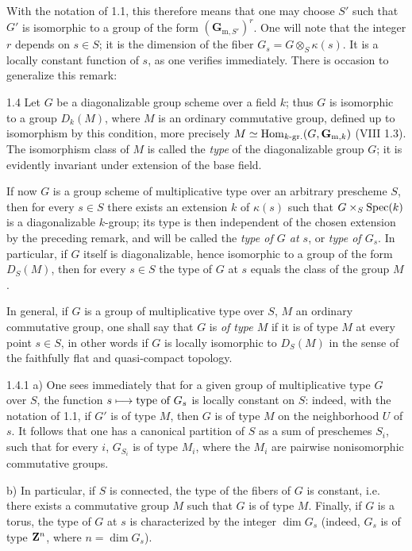With the notation of 1.1, this therefore means that one may choose $S'$ such that $G'$ is isomorphic to a group of the form $(\mathbf{G}_{\mathrm{m},S'})^r$. One will note that the integer $r$ depends on $s\in S$; it is the dimension of the fiber $G_s=G\otimes_S\kappa(s)$. It is a locally constant function of $s$, as one verifies immediately. There is occasion to generalize this remark:
\begin{definition}{1.4}\label{IX.1.4}
Let $G$ be a diagonalizable group scheme over a field $k$; thus $G$ is isomorphic to a group $D_k(M)$, where $M$ is an ordinary commutative group, defined up to isomorphism by this condition, more precisely $M\simeq\operatorname{Hom}_{k\text{-}\mathrm{gr.}}(G,\mathbf{G}_{\mathrm{m},k})$ (VIII 1.3). The isomorphism class of $M$ is called the \emph{type} of the diagonalizable group $G$; it is evidently invariant under extension of the base field.

If now $G$ is a group scheme of multiplicative type over an arbitrary prescheme $S$, then for every $s\in S$ there exists an extension $k$ of $\kappa(s)$ such that $G\times_S\operatorname{Spec}(k)$ is a diagonalizable $k$-group; its type is then independent of the chosen extension by the preceding remark, and will be called the \emph{type of $G$ at $s$}, or \emph{type of $G_s$}. In particular, if $G$ itself is diagonalizable, hence isomorphic to a group of the form $D_S(M)$, then for every $s\in S$ the type of $G$ at $s$ equals the class of the group $M$.

In general, if $G$ is a group of multiplicative type over $S$, $M$ an ordinary commutative group, one shall say that $G$ is \emph{of type $M$} if it is of type $M$ at every point $s\in S$, in other words if $G$ is locally isomorphic to $D_S(M)$ in the sense of the faithfully flat and quasi-compact topology.
\end{definition}
\begin{remark}{1.4.1}\label{IX.1.4.1}
 a) One sees immediately that for a given group of multiplicative type $G$ over $S$, the function $s\longmapsto\text{type of }G_s$ is locally constant on $S$: indeed, with the notation of 1.1, if $G'$ is of type $M$, then $G$ is of type $M$ on the neighborhood $U$ of $s$. It follows that one has a canonical partition of $S$ as a sum of preschemes $S_i$, such that for every $i$, $G_{S_i}$ is of type $M_i$, where the $M_i$ are pairwise nonisomorphic commutative groups.

b) In particular, if $S$ is connected, the type of the fibers of $G$ is constant, i.e. there exists a commutative group $M$ such that $G$ is of type $M$. Finally, if $G$ is a torus, the type of $G$ at $s$ is characterized by the integer $\dim G_s$ (indeed, $G_s$ is of type $\mathbf{Z}^n$, where $n=\dim G_s$).
\end{remark}
